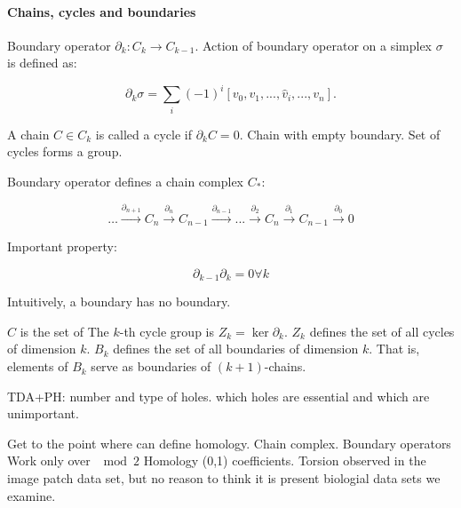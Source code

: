\begin{figure}
\centering
\caption[Simplicial Complex]{}
\label{background:fig:simplicial_complex}
\end{figure}

\paragraph{Chains, cycles and boundaries}

Boundary operator $\partial_{k}:C_{k}\rightarrow C_{k-1}$.
Action of boundary operator on a simplex $\sigma$ is defined as: 

\begin{equation}
\partial_{k}\sigma = \displaystyle\sum_{i}(-1)^{i}[v_{0},v_{1},...,\hat{v}_{i},...,v_{n}].
\end{equation}

A chain $C\in C_{k}$ is called a cycle if $\partial_{k}C=0$.
Chain with empty boundary.
Set of cycles forms a group.

Boundary operator defines a chain complex $C_{*}$:

\begin{equation}
\dots \overset{\partial_{n+1}}{\longrightarrow} C_n \overset{\partial_{n}}{\longrightarrow} C_{n-1} \overset{\partial_{n-1}}{\longrightarrow}  ... \overset{\partial_{2}}{\longrightarrow} C_n \overset{\partial_{1}}{\longrightarrow} C_{n-1} \overset{\partial_{0}}{\longrightarrow}  0
\end{equation}

Important property:

\begin{equation}
\partial_{k-1}\partial_{k} = 0 \forall k
\end{equation}

Intuitively, a boundary has no boundary.

$C$ is the set of 
The $k$-th cycle group is $Z_{k}=\ker \partial_{k}$.
$Z_{k}$ defines the set of all cycles of dimension $k$.
$B_{k}$ defines the set of all boundaries of dimension $k$.
That is, elements of $B_{k}$ serve as boundaries of $(k+1)$-chains.

TDA+PH: number and type of holes. which holes are essential and which are unimportant.

Get to the point where can define homology.
Chain complex.
Boundary operators
Work only over $\mod 2$ Homology (0,1) coefficients.
Torsion observed in the image patch data set, but no reason to think it is present biologial data sets we examine.

